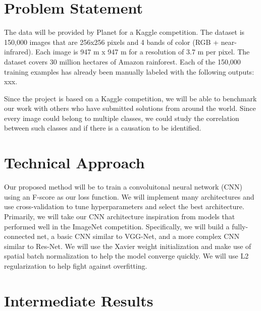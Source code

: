 \documentclass[10pt,twocolumn,letterpaper]{article}
\begin{document}
\section{Problem Statement}
The data will be provided by Planet for a Kaggle competition. The dataset is 150,000 images that are 256x256 pixels and 4 bands of color (RGB + near-infrared). Each image is 947 m x 947 m for a resolution of 3.7 m per pixel. The dataset covers 30 million hectares of Amazon rainforest. Each of the 150,000 training examples has already been manually labeled with the following outputs: xxx.

Since the project is based on a Kaggle competition, we will be able to benchmark our work with others who have submitted solutions from around the world. Since every image could belong to multiple classes, we could study the correlation between such classes and if there is a causation to be identified.


\section{Technical Approach}
Our proposed method will be to train a convoluitonal neural network (CNN) using an F-score as our loss function. We will implement many architectures and use cross-validation to tune hyperparameters and select the best architecture. Primarily, we will take our CNN architecture inspiration from models that performed well in the ImageNet competition. Specifically, we will build a fully-connected net, a basic CNN similar to VGG-Net, and a more complex CNN similar to Res-Net. We will use the Xavier weight initialization and make use of spatial batch normalization to help the model converge quickly. We will use L2 regularization to help fight against overfitting.





\section{Intermediate Results}


{\small


}
\end{document}

